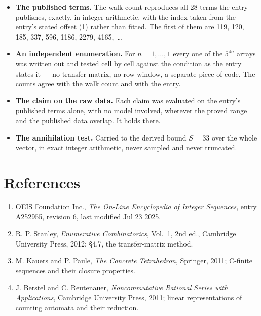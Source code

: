 \documentclass[11pt]{article}
\theoremstyle{definition}
\begin{document}
\begin{itemize}

\item {\bfseries The published terms.} The walk count reproduces all 28 terms the entry publishes, exactly, in integer arithmetic, with the index taken from the entry's stated offset (1) rather than fitted. The first of them are 119, 120, 185, 337, 596, 1186, 2279, 4165,~\dots

\item {\bfseries An independent enumeration.} For $n = 1,\dots,1$ every one of the $5^{4n}$ arrays was written out and tested cell by cell against the condition as the entry states it --- no transfer matrix, no row window, a separate piece of code. The counts agree with the walk count and with the entry.

\item {\bfseries The claim on the raw data.} Each claim was evaluated on the entry's published terms alone, with no model involved, wherever the proved range and the published data overlap. It holds there.

\item {\bfseries The annihilation test.} Carried to the derived bound $S = 33$ over the whole vector, in exact integer arithmetic, never sampled and never truncated.

\end{itemize}

\section{References}

\begin{enumerate}

\item OEIS Foundation Inc., \emph{The On-Line Encyclopedia of Integer Sequences}, entry \href{https://oeis.org/A252955}{A252955}, revision 6, last modified Jul 23 2025.

\item R. P. Stanley, \emph{Enumerative Combinatorics}, Vol.~1, 2nd ed., Cambridge University Press, 2012; \S4.7, the transfer-matrix method.

\item M. Kauers and P. Paule, \emph{The Concrete Tetrahedron}, Springer, 2011; C-finite sequences and their closure properties.

\item J. Berstel and C. Reutenauer, \emph{Noncommutative Rational Series with Applications}, Cambridge University Press, 2011; linear representations of counting automata and their reduction.

\end{enumerate}
\end{document}
